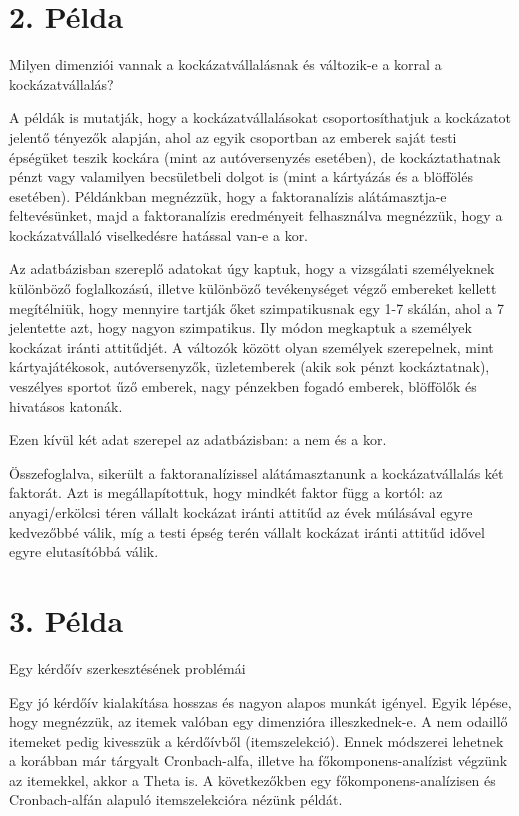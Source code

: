 \documentclass[
  letterpaper,
]{krantz}
\begin{document}
\hypertarget{puxe9lda-4}{%
\section{2. Példa}\label{puxe9lda-4}}

Milyen dimenziói vannak a kockázatvállalásnak és változik-e a korral a
kockázatvállalás?

A példák is mutatják, hogy a kockázatvállalásokat csoportosíthatjuk a
kockázatot jelentő tényezők alapján, ahol az egyik csoportban az emberek
saját testi épségüket teszik kockára (mint az autóversenyzés esetében),
de kockáztathatnak pénzt vagy valamilyen becsületbeli dolgot is (mint a
kártyázás és a blöffölés esetében). Példánkban megnézzük, hogy a
faktoranalízis alátámasztja-e feltevésünket, majd a faktoranalízis
eredményeit felhasználva megnézzük, hogy a kockázatvállaló viselkedésre
hatással van-e a kor.

Az adatbázisban szereplő adatokat úgy kaptuk, hogy a vizsgálati
személyeknek különböző foglalkozású, illetve különböző tevékenységet
végző embereket kellett megítélniük, hogy mennyire tartják őket
szimpatikusnak egy 1-7 skálán, ahol a 7 jelentette azt, hogy nagyon
szimpatikus. Ily módon megkaptuk a személyek kockázat iránti attitűdjét.
A változók között olyan személyek szerepelnek, mint kártyajátékosok,
autóversenyzők, üzletemberek (akik sok pénzt kockáztatnak), veszélyes
sportot űző emberek, nagy pénzekben fogadó emberek, blöffölők és
hivatásos katonák.

Ezen kívül két adat szerepel az adatbázisban: a nem és a kor.

Összefoglalva, sikerült a faktoranalízissel alátámasztanunk a
kockázatvállalás két faktorát. Azt is megállapítottuk, hogy mindkét
faktor függ a kortól: az anyagi/erkölcsi téren vállalt kockázat iránti
attitűd az évek múlásával egyre kedvezőbbé válik, míg a testi épség
terén vállalt kockázat iránti attitűd idővel egyre elutasítóbbá válik.

\hypertarget{puxe9lda-5}{%
\section{3. Példa}\label{puxe9lda-5}}

Egy kérdőív szerkesztésének problémái

Egy jó kérdőív kialakítása hosszas és nagyon alapos munkát igényel.
Egyik lépése, hogy megnézzük, az itemek valóban egy dimenzióra
illeszkednek-e. A nem odaillő itemeket pedig kivesszük a kérdőívből
(itemszelekció). Ennek módszerei lehetnek a korábban már tárgyalt
Cronbach-alfa, illetve ha főkomponens-analízist végzünk az itemekkel,
akkor a Theta is. A következőkben egy főkomponens-analízisen és
Cronbach-alfán alapuló itemszelekcióra nézünk példát.
\end{document}
